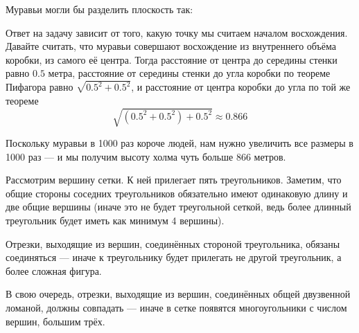 \begin{itemize}
\itA Муравьи могли бы разделить плоскость так:

\begin{center}\end{center}

\itB Ответ на задачу зависит от того, какую точку мы считаем началом восхождения.
Давайте считать, что муравьи совершают восхождение из внутреннего объёма коробки, из самого её центра.
Тогда расстояние от центра до середины стенки равно $0.5$ метра, расстояние от середины стенки до угла
коробки по теореме Пифагора равно $\sqrt{0.5^2 + 0.5^2}$, и расстояние от центра коробки до угла по той же теореме
$$\sqrt{(0.5^2 + 0.5^2) + 0.5^2} \approx 0.866$$

Поскольку муравьи в 1000 раз короче людей, нам нужно увеличить все размеры в 1000 раз --- и мы 
получим высоту холма чуть больше 866 метров.

\itC Рассмотрим вершину сетки. К ней прилегает пять треугольников. Заметим, что общие стороны соседних
треугольников обязательно имеют одинаковую длину и две общие вершины (иначе это не будет треугольной
сеткой, ведь более длинный треугольник будет иметь как минимум 4 вершины).

\begin{center}\end{center}

Отрезки, выходящие из вершин, соединённых стороной треугольника, обязаны соединяться ---
иначе к треугольнику будет прилегать не другой треугольник, а более сложная фигура.

\begin{center}\end{center}

В свою очередь, отрезки, выходящие из вершин, соединённых общей двузвенной ломаной,
должны совпадать --- иначе в сетке появятся многоугольники с числом вершин, большим трёх.


\end{itemize}
